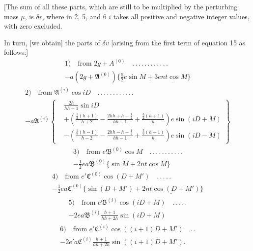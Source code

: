 [The sum of all these parts, which are still to be multiplied by the perturbing mass \(\mu\), is \(\delta r\), where in 2, 5, and 6 \(i\) takes all positive and negative integer values, with zero excluded.

In turn, [we obtain] the parts of \(\delta v\) [arising from the first term of equation 15 as follows:]
\[
\begin{gathered}
1)\quad\text{from }2g+A^{(0)}\quad .\, .\, .\, .\, .\, .\, .\, .\, .\, .\, .\, .\\[.5ex]
-a(2g+\mathfrak A^{(0)})\{\tfrac52e\sin M+\underline{3ent\cos M\}}
\end{gathered}
\]
\[
\begin{gathered}
2)\quad\text{from }\mathfrak A^{(i)}\cos iD\quad .\, .\, .\, .\, .\, .\, .\, .\, .\, .\, .\, .\\[.5ex]
-a\mathfrak A^{(i)}\left\{\begin{aligned}
&\frac{2h}{hh-1}\sin iD\\
&+\left(\frac{\tfrac12(h+1)}{h+2}-\frac{2hh+h-\tfrac12}{hh-1}+\frac{\tfrac32(h+1)}h\right)e\sin(iD+M)\\
&-\left(\frac{\tfrac12(h-1)}{h-2}-\frac{2hh-h-\tfrac12}{hh-1}+\frac{\tfrac32(h-1)}h\right)e\sin(iD-M)
\end{aligned}\right\}
\end{gathered}
\]
\[
\begin{gathered}
3)\quad\text{from }e\mathfrak B^{(0)}\cos M\quad .\, .\, .\, .\, .\, .\, .\, .\, .\, .\, .\\[.5ex]
-\tfrac12ea\mathfrak B^{(0)}\{\sin M+\underline{2nt\cos M}\}
\end{gathered}
\]
\[
\begin{gathered}
4)\quad\text{from }e'\mathfrak C^{(0)}\cos(D+M')\quad .\, .\, .\, .\, .\\[.5ex]
-\tfrac12ea\mathfrak C^{(0)}\{\sin(D+M')+\underline{2nt\cos(D+M')}\}
\end{gathered}
\]
\[
\begin{gathered}
5)\quad\text{from }e\mathfrak B^{(i)}\cos(iD+M)\quad .\, .\, .\, .\, .\\[.5ex]
-2ea\mathfrak B^{(i)}\frac{h+1}{hh+2h}\sin(iD+M)
\end{gathered}
\]
\[
\begin{gathered}
6)\quad\text{from }e'\mathfrak C^{(i)}\cos((i+1)D+M')\quad .\, .\\[.5ex]
-2e'a\mathfrak C^{(i)}\frac{h+1}{hh+2h}\sin((i+1)D+M').
\end{gathered}
\]

